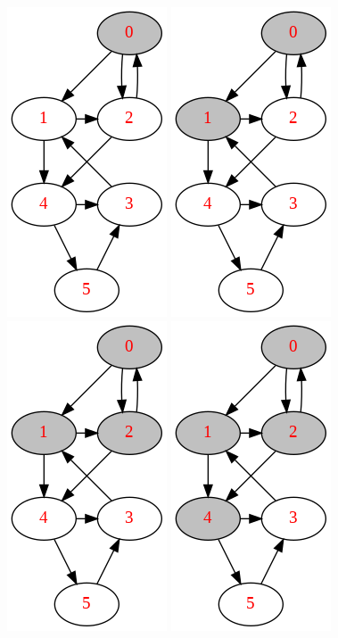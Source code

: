 \documentclass[main.tex]{subfiles}
\begin{document}
\begin{figure}[!ht]
    \centering
    \includegraphics[width=0.2\columnwidth]{fig/depth_first_graph_search_process0.png}
    \includegraphics[width=0.2\columnwidth]{fig/depth_first_graph_search_process1.png}
    \includegraphics[width=0.2\columnwidth]{fig/depth_first_graph_search_process2.png}
    \includegraphics[width=0.2\columnwidth]{fig/depth_first_graph_search_process3.png}
    

\end{figure}
\end{document}
